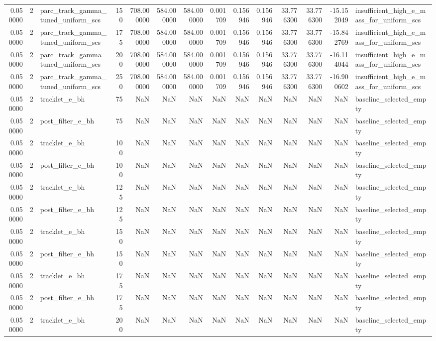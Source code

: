 \begin{tabular}{rrlrrrrrrrrrrl}
0.050000 & 2 & parc_track_gamma_tuned_uniform_scs & 150 & 708.000000 & 584.000000 & 584.000000 & 0.001709 & 0.156946 & 0.156946 & 33.776300 & 33.776300 & -15.152049 & insufficient_high_e_mass_for_uniform_scs \\
0.050000 & 2 & parc_track_gamma_tuned_uniform_scs & 175 & 708.000000 & 584.000000 & 584.000000 & 0.001709 & 0.156946 & 0.156946 & 33.776300 & 33.776300 & -15.842769 & insufficient_high_e_mass_for_uniform_scs \\
0.050000 & 2 & parc_track_gamma_tuned_uniform_scs & 200 & 708.000000 & 584.000000 & 584.000000 & 0.001709 & 0.156946 & 0.156946 & 33.776300 & 33.776300 & -16.114044 & insufficient_high_e_mass_for_uniform_scs \\
0.050000 & 2 & parc_track_gamma_tuned_uniform_scs & 250 & 708.000000 & 584.000000 & 584.000000 & 0.001709 & 0.156946 & 0.156946 & 33.776300 & 33.776300 & -16.900602 & insufficient_high_e_mass_for_uniform_scs \\
0.050000 & 2 & tracklet_e_bh & 75 & NaN & NaN & NaN & NaN & NaN & NaN & NaN & NaN & NaN & baseline_selected_empty \\
0.050000 & 2 & post_filter_e_bh & 75 & NaN & NaN & NaN & NaN & NaN & NaN & NaN & NaN & NaN & baseline_selected_empty \\
0.050000 & 2 & tracklet_e_bh & 100 & NaN & NaN & NaN & NaN & NaN & NaN & NaN & NaN & NaN & baseline_selected_empty \\
0.050000 & 2 & post_filter_e_bh & 100 & NaN & NaN & NaN & NaN & NaN & NaN & NaN & NaN & NaN & baseline_selected_empty \\
0.050000 & 2 & tracklet_e_bh & 125 & NaN & NaN & NaN & NaN & NaN & NaN & NaN & NaN & NaN & baseline_selected_empty \\
0.050000 & 2 & post_filter_e_bh & 125 & NaN & NaN & NaN & NaN & NaN & NaN & NaN & NaN & NaN & baseline_selected_empty \\
0.050000 & 2 & tracklet_e_bh & 150 & NaN & NaN & NaN & NaN & NaN & NaN & NaN & NaN & NaN & baseline_selected_empty \\
0.050000 & 2 & post_filter_e_bh & 150 & NaN & NaN & NaN & NaN & NaN & NaN & NaN & NaN & NaN & baseline_selected_empty \\
0.050000 & 2 & tracklet_e_bh & 175 & NaN & NaN & NaN & NaN & NaN & NaN & NaN & NaN & NaN & baseline_selected_empty \\
0.050000 & 2 & post_filter_e_bh & 175 & NaN & NaN & NaN & NaN & NaN & NaN & NaN & NaN & NaN & baseline_selected_empty \\
0.050000 & 2 & tracklet_e_bh & 200 & NaN & NaN & NaN & NaN & NaN & NaN & NaN & NaN & NaN & baseline_selected_empty \\

\end{tabular}

